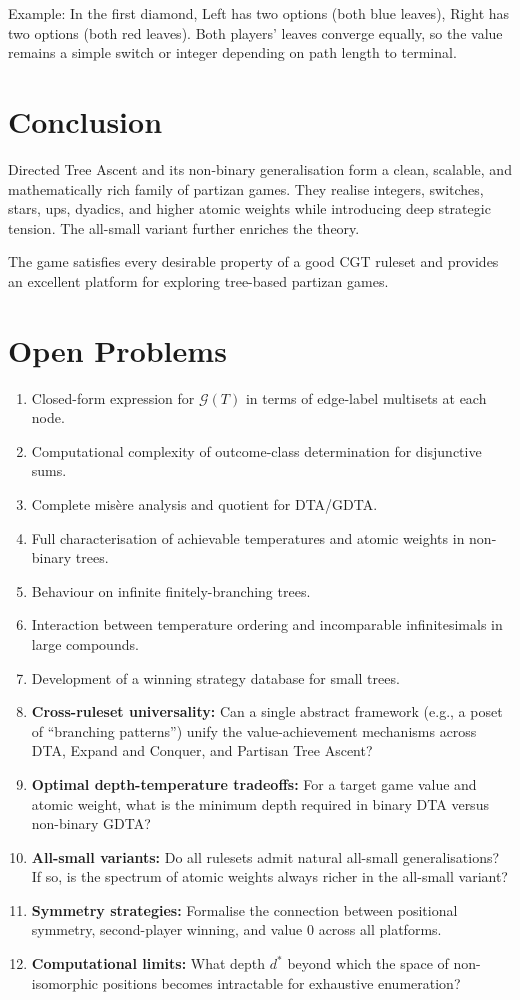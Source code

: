 \documentclass[10pt,a4paper,twocolumn]{article}
\newcommand{\Gv}[1]{\mathcal{G}(#1)}
\theoremstyle{plain}
\theoremstyle{definition}
\theoremstyle{remark}
\begin{document}
Example: In the first diamond, Left has two options (both blue leaves), Right has two options (both red leaves). Both players' leaves converge equally, so the value remains a simple switch or integer depending on path length to terminal.

\section{Conclusion}

Directed Tree Ascent and its non-binary generalisation form a clean, scalable, and mathematically rich family of partizan games. They realise integers, switches, stars, ups, dyadics, and higher atomic weights while introducing deep strategic tension. The all-small variant further enriches the theory.

The game satisfies every desirable property of a good CGT ruleset and provides an excellent platform for exploring tree-based partizan games.

\section{Open Problems}

\begin{enumerate}[label=(\roman*)]
\item Closed-form expression for \(\Gv{T}\) in terms of edge-label multisets at each node.
\item Computational complexity of outcome-class determination for disjunctive sums.
\item Complete misère analysis and quotient for DTA/GDTA.
\item Full characterisation of achievable temperatures and atomic weights in non-binary trees.
\item Behaviour on infinite finitely-branching trees.
\item Interaction between temperature ordering and incomparable infinitesimals in large compounds.
\item Development of a winning strategy database for small trees.
\item \textbf{Cross-ruleset universality:} Can a single abstract framework (e.g., a poset of ``branching patterns'') unify the value-achievement mechanisms across DTA, Expand and Conquer, and Partisan Tree Ascent?
\item \textbf{Optimal depth-temperature tradeoffs:} For a target game value and atomic weight, what is the minimum depth required in binary DTA versus non-binary GDTA?
\item \textbf{All-small variants:} Do all rulesets admit natural all-small generalisations? If so, is the spectrum of atomic weights always richer in the all-small variant?
\item \textbf{Symmetry strategies:} Formalise the connection between positional symmetry, second-player winning, and value $0$ across all platforms.
\item \textbf{Computational limits:} What depth $d^*$ beyond which the space of non-isomorphic positions becomes intractable for exhaustive enumeration?
\end{enumerate}
\end{document}
